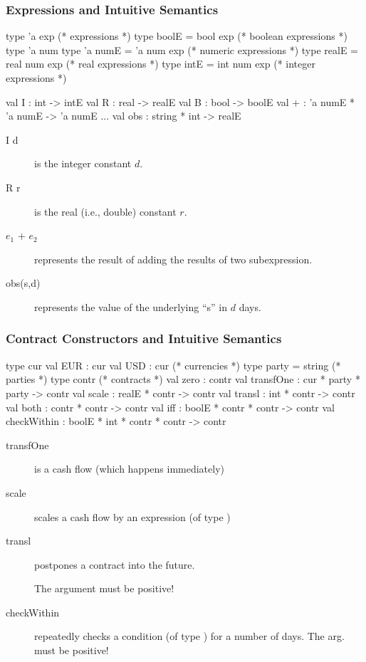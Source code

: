 \documentclass[xcolor=dvipsnames,11pt]{beamer}
\renewcommand{\emph}[1]{\textcolor{structure!90}{#1}}
\begin{document}
\begin{frame}[fragile,t]
    \frametitle{Expressions and Intuitive Semantics}

\begin{mlcode}
  type 'a exp                     (* expressions *)
  type boolE = bool exp           (* boolean expressions *)
  type 'a num 
  type 'a numE = 'a num exp       (* numeric expressions *)
  type realE = real num exp       (*  real expressions *)
  type intE = int num exp         (*  integer expressions *)
 
  val I   : int -> intE
  val R   : real -> realE
  val B   : bool -> boolE
  val +   : 'a numE * 'a numE -> 'a numE
  ...
  val obs : string * int -> realE
\end{mlcode}

\begin{description}
\item[I d] is the integer constant $d$.
\item[R r] is the real (i.e., double) constant $r$.
\item[$e_1$ + $e_2$] represents the result of adding the results of two subexpression.
\item[obs(s,d)] represents the value of the underlying ``s'' in $d$ days.
\end{description}

\end{frame}

\begin{frame}[fragile,t]
    \frametitle{Contract Constructors and Intuitive Semantics}

\begin{mlcode}
  type cur val EUR : cur val USD : cur    (* currencies *)
  type party = string                     (* parties *)
  type contr                              (* contracts *)
  val zero        : contr             
  val transfOne   : cur * party * party -> contr
  val scale       : realE * contr -> contr
  val transl      : int * contr -> contr
  val both        : contr * contr -> contr
  val iff         : boolE * contr * contr -> contr
  val checkWithin : boolE * int * contr * contr -> contr
\end{mlcode}

\begin{description}
\item[transfOne] is a cash flow (which happens immediately)
\item[scale] scales a cash flow by an expression (of type )
\item[transl] postpones a contract into the \emph{future}.

    The  argument must be positive!

\item[checkWithin] repeatedly checks a condition (of type ) for a number of days.
    The  arg. must be positive!
\end{description}

\end{frame}
\end{document}
